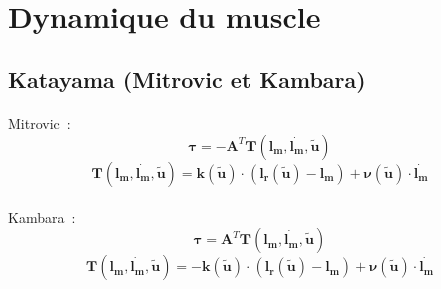 \documentclass[pdftex,a4paper,11pt]{report}
\newcommand{\vs}[1]{\boldsymbol{#1}} %
\newcommand{\ms}[1]{\boldsymbol{#1}} %
\numberwithin{equation}{subsection}
\begin{document}
\begin{figure}[h]
    \centering
    ~~~
    ~~~
\end{figure}


\section{Dynamique du muscle}

\subsection{Katayama (Mitrovic et Kambara)}

\paragraph{}
Mitrovic~:
\[ \vs{\tau} = -\ms{A}^T \vs{T}(\vs{l_m}, \vs{\dot{l_m}}, \vs{\tilde{u}}) \]
\[ \vs{T}(\vs{l_m}, \vs{\dot{l_m}}, \vs{\tilde{u}}) = \vs{k}(\vs{\tilde{u}})  \cdot (\vs{l_r}(\vs{\tilde{u}}) - \vs{l_m}) + \vs{\nu}(\vs{\tilde{u}}) \cdot \vs{\dot{l_m}} \]

\paragraph{}
Kambara~:
\[ \vs{\tau} = \ms{A}^T \vs{T}(\vs{l_m}, \vs{\dot{l_m}}, \vs{\tilde{u}}) \]
\[ \vs{T}(\vs{l_m}, \vs{\dot{l_m}}, \vs{\tilde{u}}) = -\vs{k}(\vs{\tilde{u}}) \cdot (\vs{l_r}(\vs{\tilde{u}}) - \vs{l_m}) + \vs{\nu}(\vs{\tilde{u}}) \cdot \vs{\dot{l_m}} \]
\end{document}

